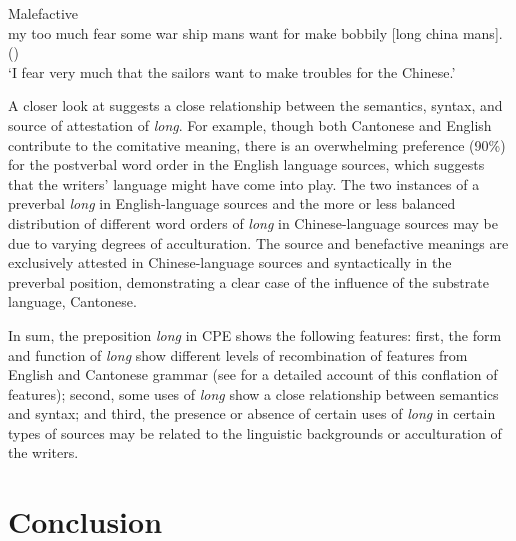 \documentclass[output=paper]{langsci/langscibook}
\begin{document}
\ex Malefactive\\\label{ex:7:9}
my too much fear some war ship mans want for make bobbily [long china mans]. (\citealt[968]{tilden_journal._1834})\\
\glt ‘I fear very much that the sailors want to make troubles for the Chinese.’
\z
    
A closer look at  suggests a close relationship between the semantics, syntax, and source of attestation of \textit{long}. For example, though both Cantonese and English contribute to the comitative meaning, there is an overwhelming preference (90\%) for the postverbal word order in the English language sources, which suggests that the writers’ language might have come into play. The two instances of a preverbal \textit{long} in English-language sources and the more or less balanced distribution of different word orders of \textit{long} in Chinese-language sources may be due to varying degrees of acculturation. The source and benefactive meanings are exclusively attested in Chinese-language sources and syntactically in the preverbal position, demonstrating a clear case of the influence of the substrate language, Cantonese. 

In sum, the preposition \textit{long} in CPE shows the following features: first, the form and function of \textit{long} show different levels of recombination of features from English and Cantonese grammar (see \citealt{li_origins_2011} for a detailed account of this conflation of features); second, some uses of \textit{long} show a close relationship between semantics and syntax; and third, the presence or absence of certain uses of \textit{long} in certain types of sources may be related to the linguistic backgrounds or acculturation of the writers.

\section{Conclusion}\label{sec:7:6}
\end{document}
